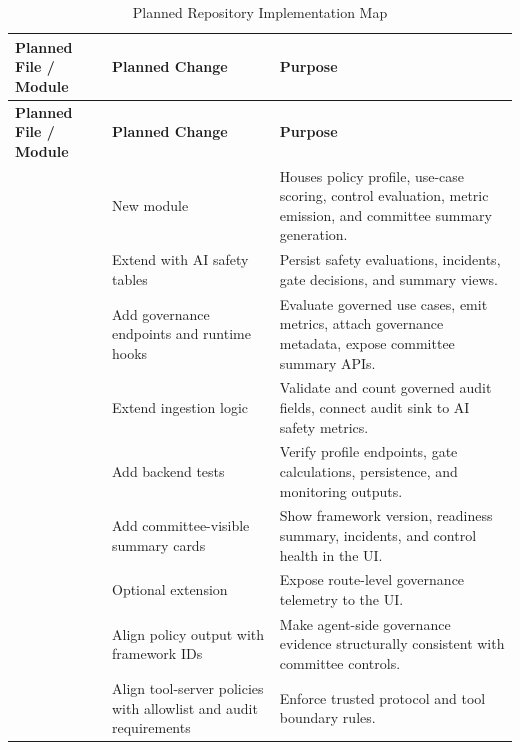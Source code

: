 \documentclass[11pt,a4paper]{article}
\begin{document}
\begin{longtable}{P{0.28\textwidth}P{0.30\textwidth}P{0.32\textwidth}}
\caption{Planned Repository Implementation Map} \\
\toprule
\textbf{Planned File / Module} & \textbf{Planned Change} & \textbf{Purpose} \\
\midrule
\endfirsthead
\toprule
\textbf{Planned File / Module} & \textbf{Planned Change} & \textbf{Purpose} \\
\midrule
\endhead
{} & New module & Houses policy profile, use-case scoring, control evaluation, metric emission, and committee summary generation. \\
 & Extend with AI safety tables & Persist safety evaluations, incidents, gate decisions, and summary views. \\
 & Add governance endpoints and runtime hooks & Evaluate governed use cases, emit metrics, attach governance metadata, expose committee summary APIs. \\
 & Extend ingestion logic & Validate and count governed audit fields, connect audit sink to AI safety metrics. \\
 & Add backend tests & Verify profile endpoints, gate calculations, persistence, and monitoring outputs. \\
 & Add committee-visible summary cards & Show framework version, readiness summary, incidents, and control health in the UI. \\
 & Optional extension & Expose route-level governance telemetry to the UI. \\
 & Align policy output with framework IDs & Make agent-side governance evidence structurally consistent with committee controls. \\
 & Align tool-server policies with allowlist and audit requirements & Enforce trusted protocol and tool boundary rules. \\
\bottomrule
\end{longtable}
\end{document}
